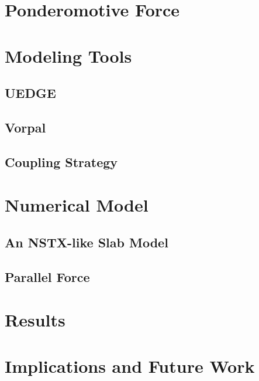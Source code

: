 \documentclass[%
 aip,
 amsmath,amssymb,
 reprint,%
]{revtex4-1}
\begin{document}
\maketitle

\section{\label{sec:ponderomotive}Ponderomotive Force}


\section{\label{sec:modelingtools}Modeling Tools}
\subsection{\label{sec:uedge}UEDGE}

\subsection{\label{sec:vorpal}Vorpal}

\subsection{\label{sec:coupling}Coupling Strategy}


\section{\label{sec:slabmodel}Numerical Model}

\subsection{\label{sec:slab}An NSTX-like Slab Model}

\subsection{\label{sec:parallelforce}Parallel Force}


\section{\label{sec:results}Results}


\section{\label{sec:implications}Implications and Future Work}

\end{document}
